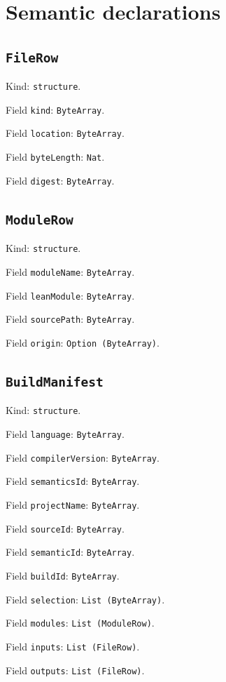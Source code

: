 \documentclass[11pt]{article}
\begin{document}
\section*{Semantic declarations}
\subsection*{\texttt{FileRow}}
\noindent Kind: \texttt{structure}.\par
\noindent Field \texttt{kind}: \texttt{ByteArray}.\par
\noindent Field \texttt{location}: \texttt{ByteArray}.\par
\noindent Field \texttt{byteLength}: \texttt{Nat}.\par
\noindent Field \texttt{digest}: \texttt{ByteArray}.\par
\subsection*{\texttt{ModuleRow}}
\noindent Kind: \texttt{structure}.\par
\noindent Field \texttt{moduleName}: \texttt{ByteArray}.\par
\noindent Field \texttt{leanModule}: \texttt{ByteArray}.\par
\noindent Field \texttt{sourcePath}: \texttt{ByteArray}.\par
\noindent Field \texttt{origin}: \texttt{Option (ByteArray)}.\par
\subsection*{\texttt{BuildManifest}}
\noindent Kind: \texttt{structure}.\par
\noindent Field \texttt{language}: \texttt{ByteArray}.\par
\noindent Field \texttt{compilerVersion}: \texttt{ByteArray}.\par
\noindent Field \texttt{semanticsId}: \texttt{ByteArray}.\par
\noindent Field \texttt{projectName}: \texttt{ByteArray}.\par
\noindent Field \texttt{sourceId}: \texttt{ByteArray}.\par
\noindent Field \texttt{semanticId}: \texttt{ByteArray}.\par
\noindent Field \texttt{buildId}: \texttt{ByteArray}.\par
\noindent Field \texttt{selection}: \texttt{List (ByteArray)}.\par
\noindent Field \texttt{modules}: \texttt{List (ModuleRow)}.\par
\noindent Field \texttt{inputs}: \texttt{List (FileRow)}.\par
\noindent Field \texttt{outputs}: \texttt{List (FileRow)}.\par
\end{document}
